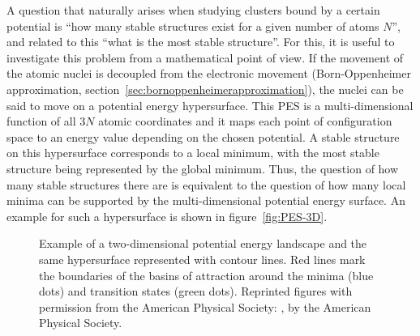 A question that naturally arises when studying clusters bound by a certain
potential is ``how many stable structures exist for a given number of atoms
$N$'', and related to this ``what is the most stable structure''. For this, it
is useful to investigate this problem from a mathematical point of view. If the
movement of the atomic nuclei is decoupled from the electronic movement
(Born-Oppenheimer approximation,
section~\ref{sec:bornoppenheimerapproximation}), the nuclei can be said to move
on a potential energy hypersurface. This \ac{PES} is a multi-dimensional
function of all $3N$ atomic coordinates and it maps each point of configuration
space to an energy value depending on the chosen potential. A stable structure
on this hypersurface corresponds to a local minimum, with the most stable
structure being represented by the global minimum. Thus, the question of how
many stable structures there are is equivalent to the question of how many local
minima can be supported by the multi-dimensional potential energy surface. An
example for such a hypersurface is shown in figure~\ref{fig:PES-3D}.
%
\begin{figure}[htb]
    \centering
    \hspace{0.05\textwidth}
    \caption{\protect{} Example of a two-dimensional potential energy landscape and \protect{} the same hypersurface represented with contour lines. Red lines mark the boundaries of the basins of attraction around the minima (blue dots) and transition states (green dots). Reprinted figures with permission from the American Physical Society: \autocite{Massen_Powerlawdistributionsareas_2007},  by the American Physical Society.}
    \label{fig:PES}
\end{figure}
